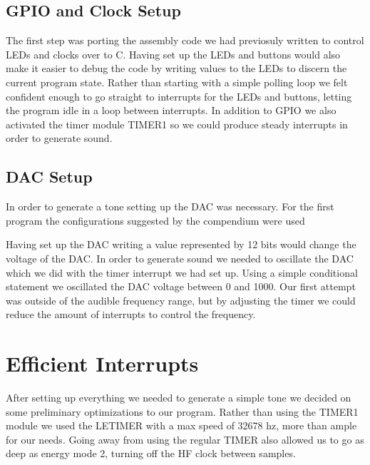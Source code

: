 \subsection{GPIO and Clock Setup} 
The first step was porting the assembly code we had previosuly written to control LEDs and clocks over to C. Having set up the LEDs and buttons would also make it easier to debug the code by writing values to the LEDs to discern the current program state. Rather than starting with a simple polling loop we felt confident enough to go straight to interrupts for the LEDs and buttons, letting the program idle in a loop between interrupts. In addition to GPIO we also activated the timer module TIMER1 so we could produce steady interrupts in order to generate sound.


\subsection{DAC Setup}
In order to generate a tone setting up the DAC was necessary. For the first program the configurations suggested by the compendium were used


Having set up the DAC writing a value represented by 12 bits would change the voltage of the DAC. In order to generate sound we needed to oscillate the DAC which we did with the timer interrupt we had set up. Using a simple conditional statement we oscillated the DAC voltage between 0 and 1000. Our first attempt was outside of the audible frequency range, but by adjusting the timer we could reduce the amount of interrupts to control the frequency.

\section{Efficient Interrupts}
After setting up everything we needed to generate a simple tone we decided on some preliminary optimizations to our program. Rather than using the TIMER1 module we used the LETIMER with a max speed of 32678 hz, more than ample for our needs. Going away from using the regular TIMER also allowed us to go as deep as energy mode 2, turning off the HF clock between samples.

